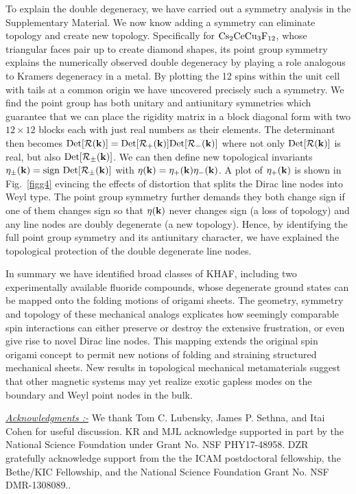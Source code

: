 \documentclass[a4paper,aps,prl,twocolumn,floatfix,showpacs,superscriptaddress]{revtex4-1}
\begin{document}
To explain the double degeneracy, we have carried out a symmetry analysis in the Supplementary Material. We now know adding a symmetry can eliminate topology and create new topology. Specifically for ${\rm Cs}_2{\rm CeCu}_3{\rm F}_{12}$, whose triangular faces pair up to create diamond shapes, its point group symmetry explains the numerically observed double degeneracy by playing a role analogous to Kramers degeneracy in a metal. By plotting the 12 spins within the unit cell with tails at a common origin we have uncovered precisely such a symmetry. We find the point group has both unitary and antiunitary symmetries which guarantee that we can place the rigidity matrix in a block diagonal form with two $12\times12$ blocks each with just real numbers as their elements. The determinant then becomes $\text{Det}[{\mathcal R}({\bf k})] = \text{Det}[{\mathcal R}_+({\bf k})]\text{Det}[{\mathcal R}_-({\bf k})]$ where not only $\text{Det}[{\mathcal R}({\bf k})]$ is real, but also $\text{Det}[{\mathcal R}_\pm({\bf k})]$. We can then define new topological invariants $\eta_\pm({\bf k}) = \text{sign}\ \text{Det}[{\mathcal R}_\pm({\bf k})]$ with $\eta({\bf k}) = \eta_+({\bf k})\eta_-({\bf k})$. A plot of $\eta_+({\bf k})$ is shown in Fig.~\ref{figg4} evincing the effects of distortion that splits the Dirac line nodes into Weyl type. The point group symmetry further demands they both change sign if one of them changes sign so that $\eta({\bf k})$ never changes sign (a loss of topology) and any line nodes are doubly degenerate (a new topology). Hence, by identifying the full point group symmetry and its antiunitary character, we have explained the topological protection of the double degenerate line nodes. 

In summary we have identified broad classes of KHAF, including two experimentally available fluoride compounds, whose degenerate ground states can be mapped onto the folding motions of origami sheets. The geometry, symmetry and topology of these mechanical analogs explicates how seemingly comparable spin interactions can either preserve or destroy the extensive frustration, or even give rise to novel Dirac line nodes. This mapping extends the original spin origami concept to permit new notions of folding and straining structured mechanical sheets. New results in topological mechanical metamaterials suggest that other magnetic systems may yet realize exotic gapless modes on the boundary and Weyl point nodes in the bulk.

\noindent
{\underline{\sl{Acknowledgments :-}}} We thank Tom C. Lubensky, James P. Sethna, and Itai Cohen for useful discussion. KR and MJL acknowledge supported in part by the National Science Foundation under Grant No. NSF PHY17-48958. DZR gratefully acknowledge support from the the ICAM postdoctoral fellowship, the Bethe/KIC Fellowship, and the National Science Foundation Grant No. NSF DMR-1308089..



\end{document}

